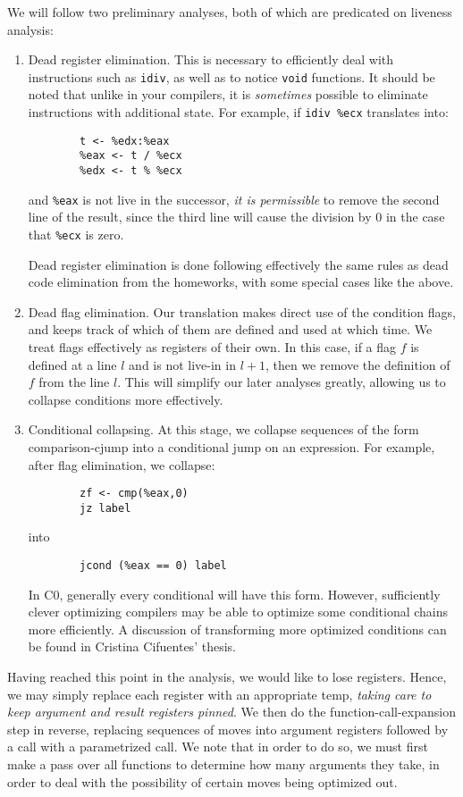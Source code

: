 \documentclass{article}
\begin{document}
We will follow two preliminary analyses, both of which are predicated on liveness
analysis:
\begin{enumerate}
\item Dead register elimination. This is necessary to efficiently deal with
	instructions such as \verb+idiv+, as well as to notice \verb+void+ functions.
	It should be noted that unlike in your compilers, it is {\em sometimes} 
	possible to eliminate instructions with additional state.
	For example, if \verb+idiv %ecx+ translates into:
	\begin{verbatim}
		t <- %edx:%eax
		%eax <- t / %ecx
		%edx <- t % %ecx
	\end{verbatim}
	and \verb+%eax+ is not live in the successor, {\em it is permissible} 
	to remove the second line of the result, since the third line will
	cause the division by $0$ in the case that \verb+%ecx+ is zero.
	
	Dead register elimination is done following effectively the same
	rules as dead code elimination from the homeworks, with some special
	cases like the above.
\item Dead flag elimination. Our translation makes direct use of the condition
	flags, and keeps track of which of them are defined and used at which time.
	We treat flags effectively as registers of their own. In this case,
	if a flag $f$ is defined at a line $l$ and is not live-in in $l+1$,
	then we remove the definition of $f$ from the line $l$. This will
	simplify our later analyses greatly, allowing us to collapse conditions
	more effectively.
\item Conditional collapsing. At this stage, we collapse sequences of the form
	comparison-cjump into a conditional jump on an expression.
	For example, after flag elimination, we collapse:
	\begin{verbatim}
		zf <- cmp(%eax,0)
		jz label
	\end{verbatim}
	into
	\begin{verbatim}
		jcond (%eax == 0) label
	\end{verbatim}
	In C0, generally every conditional will have this form. However, sufficiently
	clever optimizing compilers may be able to optimize some conditional chains
	more efficiently. A discussion of transforming more optimized conditions
	can be found in Cristina Cifuentes' thesis.
\end{enumerate}

Having reached this point in the analysis, we would like to lose registers.
Hence, we may simply replace each register with an appropriate temp,
{\em taking care to keep argument and result registers pinned}. We then
do the function-call-expansion step in reverse, replacing sequences of moves into argument
registers followed by a call with a parametrized call. We note that in order to do so,
we must first make a pass over all functions to determine how many arguments they take,
in order to deal with the possibility of certain moves being optimized out.
\end{document}
